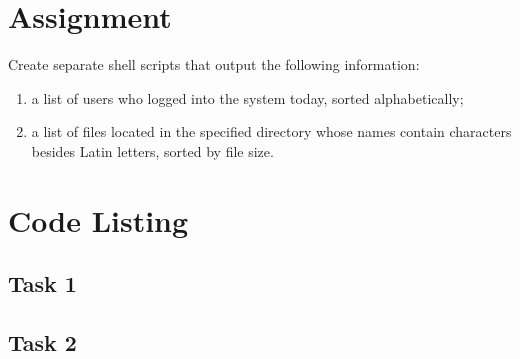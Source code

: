 \documentclass[en, listings]{labreport}
\begin{document}
\maketitlepage

\section*{Assignment}

Create separate shell scripts that output the following information:
\begin{enumerate}
\item a list of users who logged into the system today, sorted alphabetically;
\item a list of files located in the specified directory whose names contain
characters besides Latin letters, sorted by file size.
\end{enumerate}

\section*{Code Listing}

\subsection*{Task 1}



\subsection*{Task 2}


\end{document}
